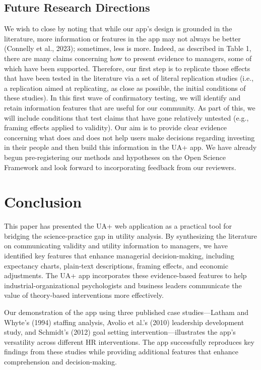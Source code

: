 \documentclass[
]{article}
\begin{document}
\subsection{Future Research
Directions}\label{future-research-directions}

We wish to close by noting that while our app's design is grounded in
the literature, more information or features in the app may not always
be better (Connelly et al., 2023); sometimes, less is more. Indeed, as
described in Table 1, there are many claims concerning how to present
evidence to managers, some of which have been supported. Therefore, our
first step is to replicate those effects that have been tested in the
literature via a set of literal replication studies (i.e., a replication
aimed at replicating, as close as possible, the initial conditions of
these studies). In this first wave of confirmatory testing, we will
identify and retain information features that are useful for our
community. As part of this, we will include conditions that test claims
that have gone relatively untested (e.g., framing effects applied to
validity). Our aim is to provide clear evidence concerning what does and
does not help users make decisions regarding investing in their people
and then build this information in the UA+ app. We have already begun
pre-registering our methods and hypotheses on the Open Science Framework
and look forward to incorporating feedback from our reviewers.

\section{Conclusion}\label{conclusion}

This paper has presented the UA+ web application as a practical tool for
bridging the science-practice gap in utility analysis. By synthesizing
the literature on communicating validity and utility information to
managers, we have identified key features that enhance managerial
decision-making, including expectancy charts, plain-text descriptions,
framing effects, and economic adjustments. The UA+ app incorporates
these evidence-based features to help industrial-organizational
psychologists and business leaders communicate the value of theory-based
interventions more effectively.

Our demonstration of the app using three published case studies---Latham
and Whyte's (1994) staffing analysis, Avolio et al.'s (2010) leadership
development study, and Schmidt's (2012) goal setting
intervention---illustrates the app's versatility across different HR
interventions. The app successfully reproduces key findings from these
studies while providing additional features that enhance comprehension
and decision-making.
\end{document}
